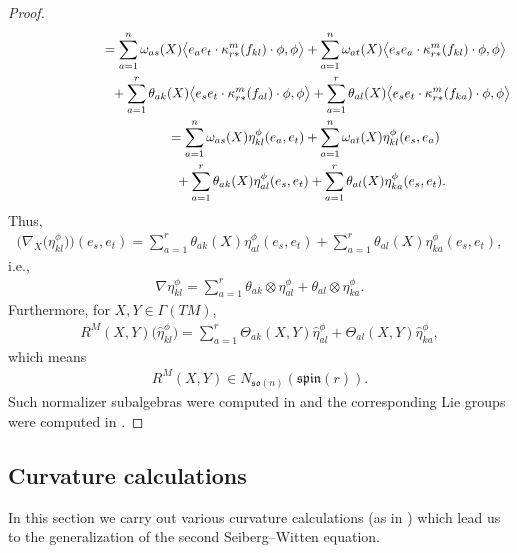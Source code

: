 \documentclass[10pt,a4paper]{amsart}
\numberwithin{equation}{section}
\begin{document}
\begin{proof}
\begin{gather*}
\hphantom{\nabla_X \big(\eta_{kl}^\phi(e_s,e_t)\big)}{}
 = \sum_{a=1}^n\omega_{as}(X)\big\langle e_a e_t\cdot \kappa_{r*}^m(f_{kl}) \cdot \phi,\phi \big\rangle
+\sum_{a=1}^n\omega_{at}(X)\big\langle e_s e_a\cdot \kappa_{r*}^m(f_{kl}) \cdot \phi,\phi \big\rangle \\
\hphantom{\nabla_X \big(\eta_{kl}^\phi(e_s,e_t)\big)=}{}
 +\sum_{a=1}^r\theta_{ak}(X)\big\langle e_s e_t\cdot \kappa_{r*}^m(f_{al}) \cdot \phi,\phi \big\rangle
+\sum_{a=1}^r\theta_{al}(X)\big\langle e_s e_t\cdot \kappa_{r*}^m(f_{ka}) \cdot \phi,\phi \big\rangle \\
\hphantom{\nabla_X \big(\eta_{kl}^\phi(e_s,e_t)\big)}{}
 = \sum_{a=1}^n\omega_{as}(X)\eta_{kl}^\phi(e_a,e_t)
+\sum_{a=1}^n\omega_{at}(X)\eta_{kl}^\phi(e_s,e_a)\\
\hphantom{\nabla_X \big(\eta_{kl}^\phi(e_s,e_t)\big)=}{}
 +\sum_{a=1}^r\theta_{ak}(X)\eta_{al}^\phi(e_s, e_t)
+\sum_{a=1}^r\theta_{al}(X)\eta_{ka}^\phi( e_s, e_t).
\end{gather*}
Thus,
\begin{gather*}
 \big(\nabla_X \big(\eta_{kl}^\phi\big)\big)(e_s,e_t)
= \sum_{a=1}^r\theta_{ak}(X)\eta_{al}^\phi(e_s, e_t)
+\sum_{a=1}^r\theta_{al}(X)\eta_{ka}^\phi( e_s, e_t),
\end{gather*}
i.e.,
\begin{gather*}
 \nabla \eta_{kl}^\phi = \sum_{a=1}^r\theta_{ak}\otimes\eta_{al}^\phi +\theta_{al}\otimes\eta_{ka}^\phi.
\end{gather*}
Furthermore, for $X,Y\in\Gamma(TM)$,
\begin{gather}
R^M(X,Y)\big(\hat\eta_{kl}^\phi\big)= \sum_{a=1}^r \Theta_{ak}(X,Y)\hat\eta_{al}^\phi+\Theta_{al}(X,Y)\hat\eta_{ka}^\phi, \label{eq: curvature identity endomorphisms}
\end{gather}
which means
\begin{gather*}R^M(X,Y)\in N_{\mathfrak{so}(n)}(\mathfrak{spin}(r)).\end{gather*}
Such normalizer subalgebras were computed in \cite{AH} and the corresponding Lie groups were computed in \cite{AGH}.
\end{proof}


\subsection{Curvature calculations}

In this section we carry out various curvature calculations (as in \cite{Moroianu-Semmelmann}) which lead us to the ge\-ne\-ralization of the second Seiberg--Witten equation.
\end{document}
